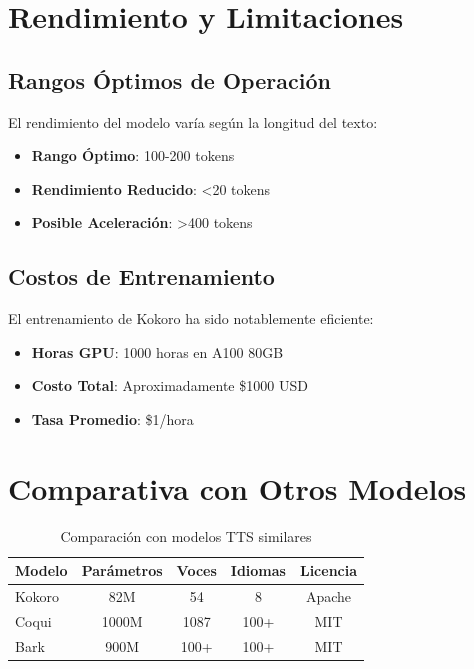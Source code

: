 \section{Rendimiento y Limitaciones}
\label{sec:performance}

\subsection{Rangos Óptimos de Operación}
\label{subsec:optimal-ranges}

El rendimiento del modelo varía según la longitud del texto:
\begin{itemize}
	\item \textbf{Rango Óptimo}: 100-200 tokens
	\item \textbf{Rendimiento Reducido}: <20 tokens
	\item \textbf{Posible Aceleración}: >400 tokens
\end{itemize}

\subsection{Costos de Entrenamiento}
\label{subsec:training-costs}

El entrenamiento de Kokoro ha sido notablemente eficiente:
\begin{itemize}
	\item \textbf{Horas GPU}: 1000 horas en A100 80GB
	\item \textbf{Costo Total}: Aproximadamente \$1000 USD
	\item \textbf{Tasa Promedio}: \$1/hora
\end{itemize}

\section{Comparativa con Otros Modelos}
\label{sec:model-comparison}

\begin{table}[H]
	\centering
	\caption{Comparación con modelos TTS similares}
	\label{tab:model-comparison}
	\begin{tabular}{|l|c|c|c|c|}
		\hline
		\textbf{Modelo} & \textbf{Parámetros} & \textbf{Voces} & \textbf{Idiomas} & \textbf{Licencia} \\
		\hline
		Kokoro          & 82M                 & 54             & 8                & Apache            \\
		\hline
		Coqui           & 1000M               & 1087           & 100+             & MIT               \\
		\hline
		Bark            & 900M                & 100+           & 100+             & MIT               \\
		\hline
	\end{tabular}
\end{table}